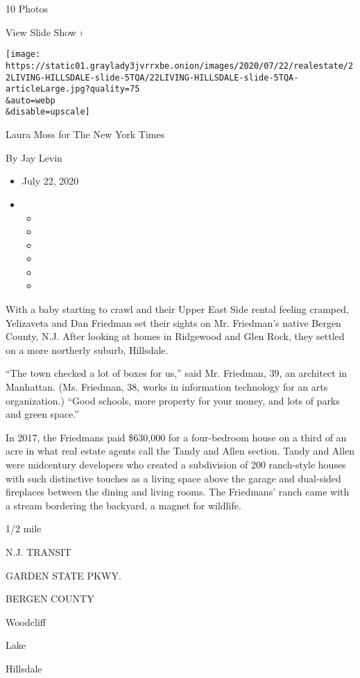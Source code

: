 10 Photos

View Slide Show ›

\texttt{[image: https://static01.graylady3jvrrxbe.onion/images/2020/07/22/realestate/22LIVING-HILLSDALE-slide-5TQA/22LIVING-HILLSDALE-slide-5TQA-articleLarge.jpg?quality=75\\\&auto=webp\\\&disable=upscale]}

Laura Moss for The New York Times

By Jay Levin

\begin{itemize}
\item
  July 22, 2020
\item
  \begin{itemize}
  \item
  \item
  \item
  \item
  \item
  \item
  \end{itemize}
\end{itemize}

With a baby starting to crawl and their Upper East Side rental feeling
cramped, Yelizaveta and Dan Friedman set their sights on Mr. Friedman's
native Bergen County, N.J. After looking at homes in Ridgewood and Glen
Rock, they settled on a more northerly suburb, Hillsdale.

``The town checked a lot of boxes for us,'' said Mr. Friedman, 39, an
architect in Manhattan. (Ms. Friedman, 38, works in information
technology for an arts organization.) ``Good schools, more property for
your money, and lots of parks and green space.''

In 2017, the Friedmans paid \$630,000 for a four-bedroom house on a
third of an acre in what real estate agents call the Tandy and Allen
section. Tandy and Allen were midcentury developers who created a
subdivision of 200 ranch-style houses with such distinctive touches as a
living space above the garage and dual-sided fireplaces between the
dining and living rooms. The Friedmans' ranch came with a stream
bordering the backyard, a magnet for wildlife.

1/2 mile

N.J. TRANSIT

GARDEN STATE PKWY.

BERGEN COUNTY

Woodcliff

Lake

Hillsdale

